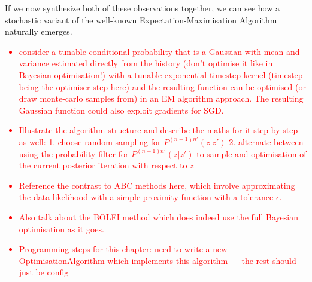 If we now synthesize both of these observations together, we can see how a stochastic variant of the well-known Expectation-Maximisation Algorithm~\cite{hartley1958maximum, dempster1977maximum, murphy2012machine} naturally emerges.

\textcolor{red}{\begin{itemize}
\item{consider a tunable conditional probability that is a Gaussian with mean and variance estimated directly from the history (don't optimise it like in Bayesian optimisation!) with a tunable exponential timestep kernel (timestep being the optimiser step here) and the resulting function can be optimised (or draw monte-carlo samples from) in an EM algorithm approach. The resulting Gaussian function could also exploit gradients for SGD.}
\item{Illustrate the algorithm structure and describe the maths for it step-by-step as well: 1. choose random sampling for $P^{(n+1)n'}(z\vert z')$ 2. alternate between using the probability filter for $P^{(n+1)n'}(z\vert z')$ to sample and optimisation of the current posterior iteration with respect to $z$}
\item{Reference the contrast to ABC methods here, which involve approximating the data likelihood with a simple proximity function with a tolerance $\epsilon$.}
\item{Also talk about the BOLFI method which does indeed use the full Bayesian optimisation as it goes.}
\item{Programming steps for this chapter: need to write a new OptimisationAlgorithm which implements this algorithm --- the rest should just be config}
\end{itemize}}

